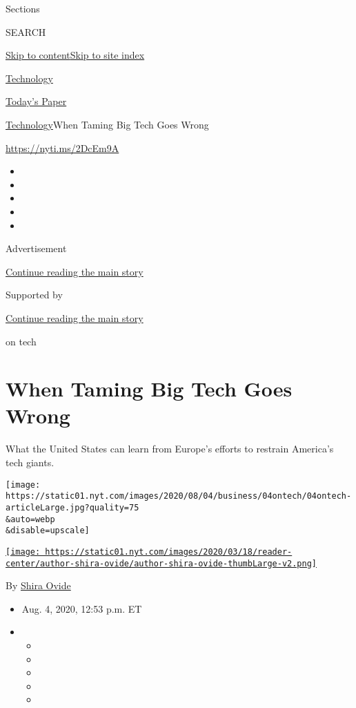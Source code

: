 Sections

SEARCH

\protect\hyperlink{site-content}{Skip to
content}\protect\hyperlink{site-index}{Skip to site index}

\href{https://www.nytimes.com/section/technology}{Technology}

\href{https://myaccount.nytimes.com/auth/login?response_type=cookie\&client_id=vi}{}

\href{https://www.nytimes.com/section/todayspaper}{Today's Paper}

\href{/section/technology}{Technology}\textbar{}When Taming Big Tech
Goes Wrong

\url{https://nyti.ms/2DcEm9A}

\begin{itemize}
\item
\item
\item
\item
\item
\end{itemize}

Advertisement

\protect\hyperlink{after-top}{Continue reading the main story}

Supported by

\protect\hyperlink{after-sponsor}{Continue reading the main story}

on tech

\hypertarget{when-taming-big-tech-goes-wrong}{%
\section{When Taming Big Tech Goes
Wrong}\label{when-taming-big-tech-goes-wrong}}

What the United States can learn from Europe's efforts to restrain
America's tech giants.

\texttt{[image: https://static01.nyt.com/images/2020/08/04/business/04ontech/04ontech-articleLarge.jpg?quality=75\\\&auto=webp\\\&disable=upscale]}

\href{https://www.nytimes.com/by/shira-ovide}{\texttt{[image: https://static01.nyt.com/images/2020/03/18/reader-center/author-shira-ovide/author-shira-ovide-thumbLarge-v2.png]}}

By \href{https://www.nytimes.com/by/shira-ovide}{Shira Ovide}

\begin{itemize}
\item
  Aug. 4, 2020, 12:53 p.m. ET
\item
  \begin{itemize}
  \item
  \item
  \item
  \item
  \item
  \end{itemize}
\end{itemize}

